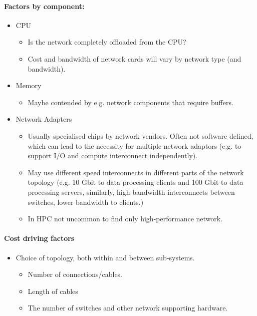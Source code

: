 \documentclass{../../template/esiwace-report}
\begin{document}
\paragraph{Factors by component:}
\begin{itemize}
	\item  CPU
	\begin{itemize}
		\item Is the network completely offloaded from the CPU?
		\item Cost and bandwidth of network cards will vary by network type (and bandwidth).
	\end{itemize}

	\item Memory
	\begin{itemize}
		\item  Maybe contended by e.g. network components that require buffers.
	\end{itemize}

	\item Network Adapters
	\begin{itemize}
		\item Usually specialised chips by network vendors. Often not software defined, which can lead to the necessity for multiple network adaptors
		(e.g. to support I/O and compute interconnect independently).
		\item May use different speed interconnects in different parts of the network topology (e.g. 10 Gbit to data processing clients and 100 Gbit to data processing servers, similarly, high bandwidth interconnects between switches, lower bandwidth to clients.)
		\item In HPC not uncommon to find only high-performance network.
	\end{itemize}

\end{itemize}



\paragraph{Cost driving factors}
\begin{itemize}
	\item Choice of topology, both within and between sub-systems.
	\begin{itemize}
		\item Number of connections/cables.
		\item Length of cables
		\item The number of switches and other network supporting hardware.
	\end{itemize}
\end{itemize}
\end{document}
